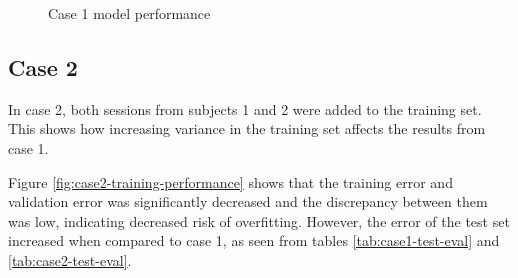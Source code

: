 \documentclass[../main.tex]{subfiles}
\begin{document}
\begin{figure}[!htb]
\begin{subfigure}[b]{0.515\textwidth}
         \label{fig:case1-prediction-performance}
     \end{subfigure}
    \caption{Case 1 model performance}
    \label{fig:case1-performance-plots}
\end{figure}

\subsection{Case 2}
\label{sec:results-case2}
In case 2, both sessions from subjects 1 and 2 were added to the training set.
This shows how increasing variance in the training set affects the results from case 1.

Figure \ref{fig:case2-training-performance} shows that the training error and validation error was significantly decreased and the discrepancy between them was low, indicating decreased risk of overfitting.
However, the error of the test set increased when compared to case 1, as seen from tables \ref{tab:case1-test-eval} and \ref{tab:case2-test-eval}.
\end{document}

